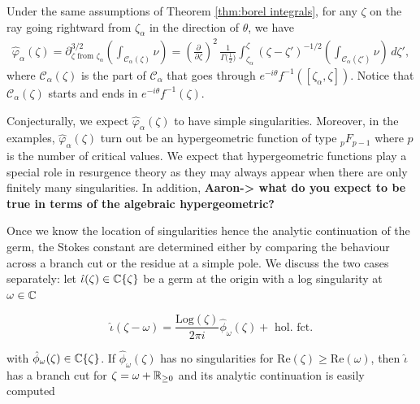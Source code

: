 \documentclass[11pt,a4paper,twoside,leqno,noamsfonts]{amsart}
\numberwithin{equation}{section}
\begin{document}
\begin{corollary}\label{cor:deriv-formula} 
Under the same assumptions of Theorem \ref{thm:borel integrals}, for any $\zeta$ on the ray going rightward from $\zeta_\alpha$ in the direction of $\theta$, we have
\begin{multline}
\hat{\varphi}_{\alpha}(\zeta)=\partial^{3/2}_{\zeta \text{ from }\zeta_\alpha} \left( \int_{\mathcal{C}_\alpha(\zeta)}\nu \right)={\left(\tfrac{\partial}{\partial \zeta}\right)^2}\,\frac{1}{\Gamma\big(\tfrac{1}{2}\big)} \int_{\zeta_\alpha}^\zeta (\zeta-\zeta')^{-1/2} {\left( \int_{\mathcal{C}_\alpha(\zeta')} \nu \right)}\,d\zeta',
\end{multline}
where $\mathcal{C}_\alpha(\zeta)$ is the part of $\mathcal{C}_\alpha$ that goes through $e^{-i\theta}f^{-1}([\zeta_\alpha, \zeta ])$. Notice that $\mathcal{C}_\alpha(\zeta)$ starts and ends in $e^{-i\theta}f^{-1}(\zeta)$. 
\end{corollary}

Conjecturally, we expect $\hat{\varphi}_\alpha(\zeta)$ to have simple singularities. Moreover, in the examples, $\hat{\varphi}_\alpha(\zeta)$ turn out be an hypergeometric function of type ${}_pF_{p-1}$ where $p$ is the number of critical values. 
We expect that hypergeometric functions play a special role in resurgence theory as they may always appear when there are only finitely many singularities. In addition,  \textbf{Aaron-> what do you expect to be true in terms of the algebraic hypergeometric?} 



Once we know the location of singularities hence the analytic continuation of the germ, the Stokes constant are determined either by comparing the behaviour across a branch cut or the residue at a simple pole. We discuss the two cases separately: let $\hat{\iota}(\zeta)\in\mathbb C\lbrace\zeta\rbrace$ be a germ at the origin with a log singularity at $\omega\in\mathbb C$

\begin{equation}
\hat{\iota}(\zeta-\omega)=\frac{\mathrm{Log}(\zeta)}{2\pi i}\hat{\phi}_{\omega}(\zeta)+\text{ hol. fct.}
\end{equation} 

with $\hat{\phi}_{\omega}(\zeta)\in\mathbb C\lbrace\zeta\rbrace$. If  $\hat{\phi}_{\omega}(\zeta)$ has no singularities for $\mathrm{Re}(\zeta)\geq \mathrm{Re}(\omega)$, then $\hat{\iota}$ has a branch cut for $\zeta=\omega+\mathbb R_{\geq 0}$  and its analytic continuation is easily computed
\end{document}
